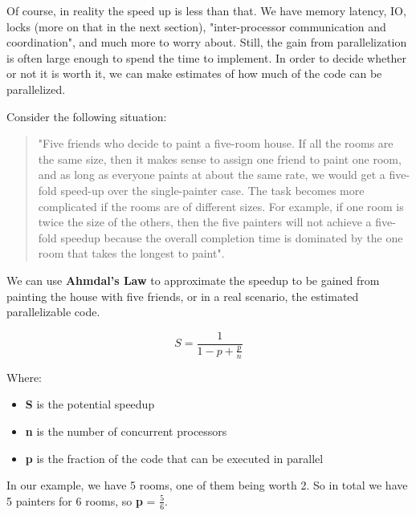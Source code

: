 \documentclass[letterpaper, 12pt]{article}
\begin{document}
\par\vspace{\baselineskip}
Of course, in reality the speed up is less than that. We have memory latency, IO, locks
(more on that in the next section), "inter-processor communication and coordination"\citep[p. 13]{artofmulti},
and much more to worry about. Still, the gain from parallelization is often large enough to spend
the time to implement. In order to decide whether or not it is worth it, we can make estimates of
how much of the code can be parallelized.

\par\vspace{\baselineskip}

\newpage
Consider the following situation:
\begin{quotation}
	"Five friends who decide to paint a five-room house. If all the rooms are the same size,
	then it makes sense to assign one friend to paint one room, and as long as everyone paints at
	about the same rate, we would get a five-fold speed-up over the single-painter case.
	The task becomes more complicated if the rooms are of different sizes. For example, if one
	room is twice the size of the others, then the five painters will not achieve a five-fold
	speedup because the overall completion time is dominated by the one room that takes the
	longest to paint"\citep[p. 13]{artofmulti}.
\end{quotation}

We can use {\bfseries Ahmdal's Law} to approximate the speedup to be gained from painting the house with five friends, or in a real scenario, the estimated parallelizable code.

\begin{equation}
	S = \frac{1}{1-p+\frac{p}{n}}
\end{equation}

Where:

\begin{itemize}
	\item {\bfseries S} is the potential speedup
	\item {\bfseries n} is the number of concurrent processors
	\item {\bfseries p} is the fraction of the code that can be executed in parallel
\end{itemize}

In our example, we have 5 rooms, one of them being worth 2. So in total we have 5 painters for 6 rooms, so
{\bfseries p} = \(\frac{5}{6}\).
\end{document}
